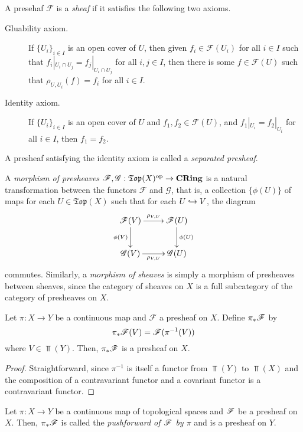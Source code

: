 \begin{definition}[Sheaf]
    A presehaf $\mathscr F$ is a \emph{sheaf} if it satisfies the following two axioms. 
    \begin{description}
        \item[Gluability axiom.] If $\{U_i\}_{i\in I}$ is an open cover of $U$, then given $f_i\in\mathscr F(U_i)$ for all $i\in I$ such that $f_i|_{U_i\cap U_j} = f_j|_{U_i\cap U_j}$ for all $i,j\in I$, then there is some $f\in\mathscr F(U)$ such that $\rho_{U,U_i}(f) = f_i$ for all $i\in I$.
        \item[Identity axiom.] If $\{U_i\}_{i\in I}$ is an open cover of $U$ and $f_1,f_2\in\mathscr F(U)$, and $f_1|_{U_i} = f_2|_{U_i}$ for all $i\in I$, then $f_1 = f_2$. 
    \end{description}
    A presheaf satisfying the identity axiom is called a \emph{separated presheaf}.
\end{definition}

\begin{definition}[Morphisms]
    A \emph{morphism of presheaves} $\mathscr F,\mathscr G:\mathfrak{Top}(X)^{\text{op}}\to\mathbf{CRing}$ is a natural transformation between the functors $\mathscr F$ and $\mathscr G$, that is, a collection $\{\phi(U)\}$ of maps for each $U\in\mathfrak{Top}(X)$ such that for each $U\hookrightarrow V$, the diagram 
    \begin{equation*}
        \xymatrix {
            \mathscr F(V)\ar[r]^-{\rho_{V,U}}\ar[d]_{\phi(V)} & \mathscr F(U)\ar[d]^{\phi(U)}\\
            \mathscr G(V)\ar[r]_-{\rho_{V,U}} & \mathscr G(U)
        }
    \end{equation*}
    commutes. Similarly, a \emph{morphism of sheaves} is simply a morphism of presheaves between sheaves, since the category of sheaves on $X$ is a full subcategory of the category of presheaves on $X$.
\end{definition}

\begin{proposition}
    Let $\pi: X\to Y$ be a continuous map and $\mathscr F$ a presheaf on $X$. Define $\pi_*\mathscr F$ by 
    \begin{equation*}
        \pi_*\mathscr F(V) = \mathscr F(\pi^{-1}(V))
    \end{equation*}
    where $V\in\Top(Y)$. Then, $\pi_\ast\mathscr F$ is a presheaf on $X$.
\end{proposition}
\begin{proof}
    Straightforward, since $\pi^{-1}$ is itself a functor from $\Top(Y)$ to $\Top(X)$ and the composition of a contravariant functor and a covariant functor is a contravariant functor.
\end{proof}

\begin{definition}
    Let $\pi: X\to Y$ be a continuous map of topological spaces and $\mathscr F$ be a presheaf on $X$. Then, $\pi_\ast\mathscr F$ is called the \emph{pushforward of $\mathscr F$ by $\pi$} and is a presheaf on $Y$.
\end{definition}